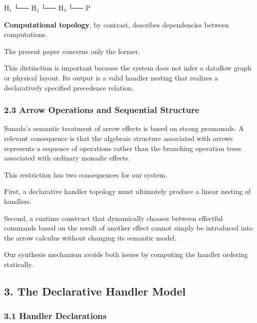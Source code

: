 \documentclass[
  11pt,
]{article}
\newenvironment{Shaded}{}{}
\newcommand{\NormalTok}[1]{#1}
\begin{document}
\begin{Shaded}
\begin{Highlighting}[]
\NormalTok{H₁}
\NormalTok{ └── H₂}
\NormalTok{      └── H₃}
\NormalTok{           └── P}
\end{Highlighting}
\end{Shaded}

\textbf{Computational topology}, by contrast, describes dependencies
between computations.

The present paper concerns only the former.

This distinction is important because the system does not infer a
dataflow graph or physical layout. Its output is a valid handler nesting
that realizes a declaratively specified precedence relation.

\subsubsection{2.3 Arrow Operations and Sequential
Structure}\label{arrow-operations-and-sequential-structure}

Sanada's semantic treatment of arrow effects is based on strong
promonads. A relevant consequence is that the algebraic structure
associated with arrows represents a sequence of operations rather than
the branching operation trees associated with ordinary monadic effects.

This restriction has two consequences for our system.

First, a declarative handler topology must ultimately produce a linear
nesting of handlers.

Second, a runtime construct that dynamically chooses between effectful
commands based on the result of another effect cannot simply be
introduced into the arrow calculus without changing its semantic model.

Our synthesis mechanism avoids both issues by computing the handler
ordering statically.

\subsection{3. The Declarative Handler
Model}\label{the-declarative-handler-model}

\subsubsection{3.1 Handler Declarations}\label{handler-declarations}
\end{document}
